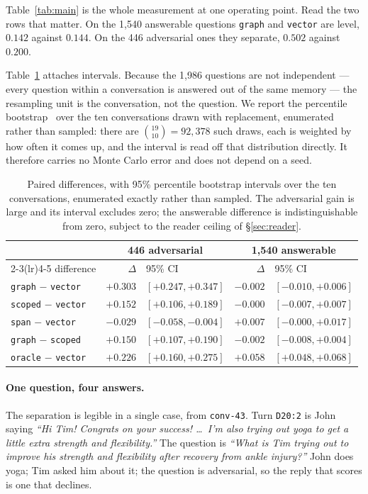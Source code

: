 \documentclass[11pt]{article}
\newcommand{\arm}[1]{\texttt{#1}}
\begin{document}
Table~\ref{tab:main} is the whole measurement at one operating point. Read the
two rows that matter. On the 1{,}540 answerable questions \arm{graph} and
\arm{vector} are level, $0.142$ against $0.144$. On the 446 adversarial ones
they separate, $0.502$ against $0.200$.

Table~\ref{tab:ci} attaches intervals. Because the 1{,}986 questions are not
independent --- every question within a conversation is answered out of the
same memory --- the resampling unit is the conversation, not the question. We
report the percentile bootstrap~\cite{bootstrap} over the ten conversations
drawn with replacement, enumerated rather than sampled: there are
$\binom{19}{10} = 92{,}378$ such draws, each is weighted by how often it comes
up, and the interval is read off that distribution directly. It therefore
carries no Monte Carlo error and does not depend on a seed.

\begin{table}[t]
\centering
\small
\caption{Paired differences, with 95\% percentile bootstrap intervals over the
ten conversations, enumerated exactly rather than sampled. The adversarial gain
is large and its interval excludes zero; the answerable difference is
indistinguishable from zero, subject to the reader ceiling of
\S\ref{sec:reader}.}
\label{tab:ci}
\begin{tabular}{@{}l rl rl@{}}
\toprule
& \multicolumn{2}{c}{446 adversarial} & \multicolumn{2}{c}{1{,}540 answerable} \\
\cmidrule(lr){2-3}\cmidrule(lr){4-5}
difference & $\Delta$ & 95\% CI & $\Delta$ & 95\% CI \\
\midrule
\arm{graph}  $-$ \arm{vector} & $+0.303$ & $[+0.247, +0.347]$ & $-0.002$ & $[-0.010, +0.006]$ \\
\arm{scoped} $-$ \arm{vector} & $+0.152$ & $[+0.106, +0.189]$ & $-0.000$ & $[-0.007, +0.007]$ \\
\arm{span}   $-$ \arm{vector} & $-0.029$ & $[-0.058, -0.004]$ & $+0.007$ & $[-0.000, +0.017]$ \\
\arm{graph}  $-$ \arm{scoped} & $+0.150$ & $[+0.107, +0.190]$ & $-0.002$ & $[-0.008, +0.004]$ \\
\arm{oracle} $-$ \arm{vector} & $+0.226$ & $[+0.160, +0.275]$ & $+0.058$ & $[+0.048, +0.068]$ \\
\bottomrule
\end{tabular}
\end{table}

\paragraph{One question, four answers.} The separation is legible in a single
case, from \texttt{conv-43}. Turn \texttt{D20:2} is John saying \emph{``Hi Tim!
Congrats on your success! \ldots\ I'm also trying out yoga to get a little
extra strength and flexibility.''} The question is \emph{``What is Tim trying
out to improve his strength and flexibility after recovery from ankle
injury?''} John does yoga; Tim asked him about it; the question is adversarial,
so the reply that scores is one that declines.
\end{document}
